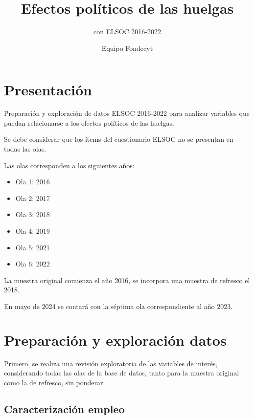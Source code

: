 \documentclass[
  12pt,
]{book}
\title{Efectos políticos de las huelgas}
\subtitle{con ELSOC 2016-2022}
\author{Equipo Fondecyt}
\date{}
\providecommand{\tightlist}{%
  \setlength{\itemsep}{0pt}\setlength{\parskip}{0pt}}
\begin{document}
\maketitle

{
\hypersetup{linkcolor=}
\setcounter{tocdepth}{1}
\tableofcontents
}
\listoffigures
\listoftables
{}
\hypertarget{presentaciuxf3n}{%
\chapter*{Presentación}\label{presentaciuxf3n}}

Preparación y exploración de datos ELSOC 2016-2022 para analizar variables que puedan relacionarse a los efectos políticos de las huelgas.

Se debe considerar que los ítems del cuestionario ELSOC no se presentan en todas las olas.

Las olas corresponden a los siguientes años:

\begin{itemize}
\tightlist
\item
  Ola 1: 2016
\item
  Ola 2: 2017
\item
  Ola 3: 2018
\item
  Ola 4: 2019
\item
  Ola 5: 2021
\item
  Ola 6: 2022
\end{itemize}

La muestra original comienza el año 2016, se incorpora una muestra de refresco el 2018.

En mayo de 2024 se contará con la séptima ola correspondiente al año 2023.

\hypertarget{preparaciuxf3n-y-exploraciuxf3n-datos}{%
\chapter{Preparación y exploración datos}\label{preparaciuxf3n-y-exploraciuxf3n-datos}}

Primero, se realiza una revisión exploratoria de las variables de interés, considerando todas las olas de la base de datos, tanto para la muestra original como la de refresco, sin ponderar.

\hypertarget{caracterizaciuxf3n-empleo}{%
\section{Caracterización empleo}\label{caracterizaciuxf3n-empleo}}
\end{document}
